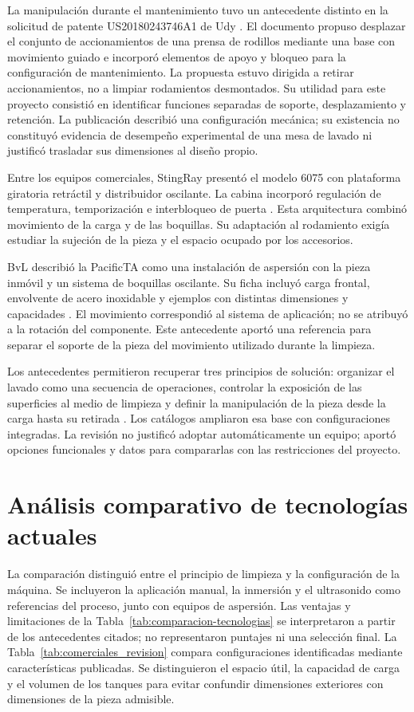La manipulación durante el mantenimiento tuvo un antecedente distinto en la solicitud de patente US20180243746A1 de Udy \cite{udy_extraccion_2018}. El documento propuso desplazar el conjunto de accionamientos de una prensa de rodillos mediante una base con movimiento guiado e incorporó elementos de apoyo y bloqueo para la configuración de mantenimiento. La propuesta estuvo dirigida a retirar accionamientos, no a limpiar rodamientos desmontados. Su utilidad para este proyecto consistió en identificar funciones separadas de soporte, desplazamiento y retención. La publicación describió una configuración mecánica; su existencia no constituyó evidencia de desempeño experimental de una mesa de lavado ni justificó trasladar sus dimensiones al diseño propio.

Entre los equipos comerciales, StingRay presentó el modelo 6075 con plataforma giratoria retráctil y distribuidor oscilante. La cabina incorporó regulación de temperatura, temporización e interbloqueo de puerta \cite{stingray_6075}. Esta arquitectura combinó movimiento de la carga y de las boquillas. Su adaptación al rodamiento exigía estudiar la sujeción de la pieza y el espacio ocupado por los accesorios.

BvL describió la PacificTA como una instalación de aspersión con la pieza inmóvil y un sistema de boquillas oscilante. Su ficha incluyó carga frontal, envolvente de acero inoxidable y ejemplos con distintas dimensiones y capacidades \cite{bvl_pacific}. El movimiento correspondió al sistema de aplicación; no se atribuyó a la rotación del componente. Este antecedente aportó una referencia para separar el soporte de la pieza del movimiento utilizado durante la limpieza.

Los antecedentes permitieron recuperar tres principios de solución: organizar el lavado como una secuencia de operaciones, controlar la exposición de las superficies al medio de limpieza y definir la manipulación de la pieza desde la carga hasta su retirada \cite{skfmaintenance2011,chalk1994,udy_extraccion_2018}. Los catálogos ampliaron esa base con configuraciones integradas. La revisión no justificó adoptar automáticamente un equipo; aportó opciones funcionales y datos para compararlas con las restricciones del proyecto.

\section{Análisis comparativo de tecnologías actuales}

La comparación distinguió entre el principio de limpieza y la configuración de la máquina. Se incluyeron la aplicación manual, la inmersión y el ultrasonido como referencias del proceso, junto con equipos de aspersión. Las ventajas y limitaciones de la Tabla~\ref{tab:comparacion-tecnologias} se interpretaron a partir de los antecedentes citados; no representaron puntajes ni una selección final. La Tabla~\ref{tab:comerciales_revision} compara configuraciones identificadas mediante características publicadas. Se distinguieron el espacio útil, la capacidad de carga y el volumen de los tanques para evitar confundir dimensiones exteriores con dimensiones de la pieza admisible.

